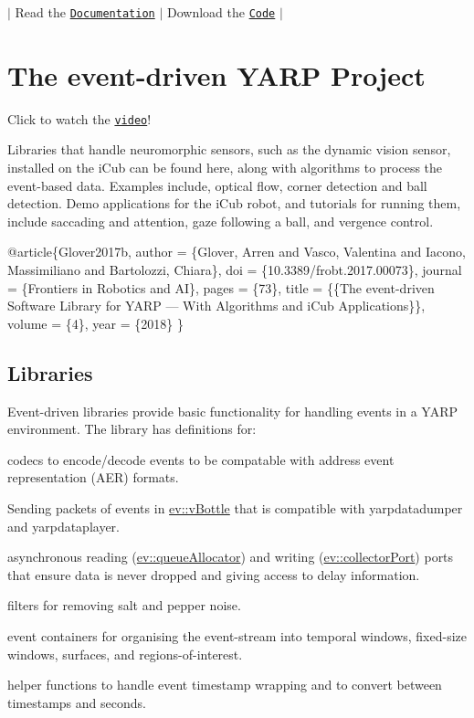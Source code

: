 $\vert$ Read the \href{http://robotology.github.io/event-driven/doxygen/doc/html/index.html}{\tt Documentation} $\vert$ Download the \href{https://github.com/robotology/event-driven}{\tt Code} $\vert$

\section*{The event-\/driven Y\+A\+RP Project}

\href{https://youtu.be/xS-7xYRYSLc}{\tt }  Click to watch the \href{https://youtu.be/xS-7xYRYSLc}{\tt video}!

Libraries that handle neuromorphic sensors, such as the dynamic vision sensor, installed on the i\+Cub can be found here, along with algorithms to process the event-\/based data. Examples include, optical flow, corner detection and ball detection. Demo applications for the i\+Cub robot, and tutorials for running them, include saccading and attention, gaze following a ball, and vergence control. 
\begin{DoxyCode}
@article\{Glover2017b,
author = \{Glover, Arren and Vasco, Valentina and Iacono, Massimiliano and Bartolozzi, Chiara\},
doi = \{10.3389/frobt.2017.00073\},
journal = \{Frontiers in Robotics and AI\},
pages = \{73\},
title = \{\{The event-driven Software Library for YARP — With Algorithms and iCub Applications\}\},
volume = \{4\},
year = \{2018\}
\}
\end{DoxyCode}
 \subsection*{Libraries}

Event-\/driven libraries provide basic functionality for handling events in a Y\+A\+RP environment. The library has definitions for\+:
\begin{DoxyItemize}
\item codecs to encode/decode events to be compatable with address event representation (A\+ER) formats.
\item Sending packets of events in {\ttfamily \hyperlink{classev_1_1vBottle}{ev\+::v\+Bottle}} that is compatible with yarpdatadumper and yarpdataplayer.
\item asynchronous reading ({\ttfamily \hyperlink{classev_1_1queueAllocator}{ev\+::queue\+Allocator}}) and writing ({\ttfamily \hyperlink{classev_1_1collectorPort}{ev\+::collector\+Port}}) ports that ensure data is never dropped and giving access to delay information.
\item filters for removing salt and pepper noise.
\item event containers for organising the event-\/stream into temporal windows, fixed-\/size windows, surfaces, and regions-\/of-\/interest.
\item helper functions to handle event timestamp wrapping and to convert between timestamps and seconds.
\end{DoxyItemize}

